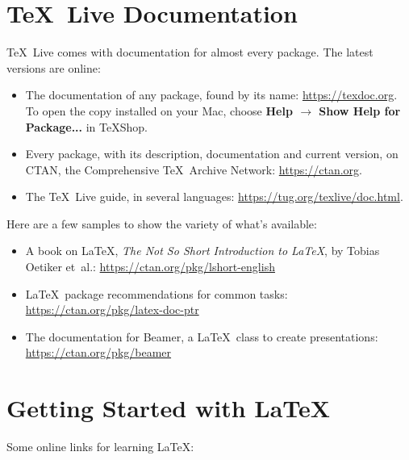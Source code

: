 \documentclass[11pt, oneside]{article}
\begin{document}
\pagestyle{empty}

\section{\TeX\ Live Documentation}

\TeX\ Live comes with documentation for almost every package. The latest versions are online:

\begin{itemize}
\item The documentation of any package, found by its name:
\url{https://texdoc.org}. To open the copy installed on your Mac, choose
\textbf{Help $\rightarrow$ Show Help for Package...} in TeXShop.

\item Every package, with its description, documentation and current version, on
CTAN, the Comprehensive \TeX\ Archive Network: \url{https://ctan.org}.

\item The \TeX\ Live guide, in several languages:
\url{https://tug.org/texlive/doc.html}.
\end{itemize}

Here are a few samples to show the variety of what's available:

\begin{itemize}

\item A book on \LaTeX, \emph{The Not So Short Introduction to \LaTeX}, by Tobias Oetiker et~al.:
\url{https://ctan.org/pkg/lshort-english}

\item \LaTeX\ package recommendations for common tasks: \url{https://ctan.org/pkg/latex-doc-ptr}

\item The documentation for Beamer, a \LaTeX\ class to create presentations:
\url{https://ctan.org/pkg/beamer}

\end{itemize}

\section{Getting Started with \LaTeX}

Some online links for learning \LaTeX:
\end{document}

